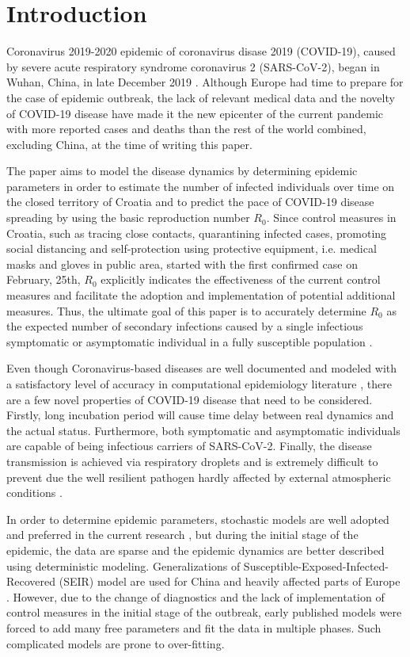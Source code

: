 \documentclass[conference]{IEEEtran}
\begin{document}
\section{Introduction}
\label{sec.introduction}
Coronavirus 2019-2020 epidemic of coronavirus disase 2019 (COVID-19), caused by severe acute respiratory syndrome coronavirus 2 (SARS-CoV-2), began in Wuhan, China, in late December 2019 \cite{who_covid_2020}. Although Europe had time to prepare for the case of epidemic outbreak, the lack of relevant medical data and the novelty of COVID-19 disease have made it the new epicenter of the current pandemic with more reported cases and deaths than the rest of the world combined, excluding China, at the time of writing this paper. 

The paper aims to model the disease dynamics by determining epidemic parameters in order to estimate the number of infected individuals over time on the closed territory of Croatia and to predict the pace of COVID-19 disease spreading by using the basic reproduction number $R_0$. Since control measures in Croatia, such as tracing close contacts, quarantining infected cases, promoting social distancing and self-protection using protective equipment, i.e. medical masks and gloves in public area, started with the first confirmed case on February, 25th, $R_0$ explicitly indicates the effectiveness of the current control measures and facilitate the adoption and implementation of potential additional measures. Thus, the ultimate goal of this paper is to accurately determine $R_0$ as the expected number of secondary infections caused by a single infectious symptomatic or asymptomatic individual in a fully susceptible population \cite{Kretzschmar2016}.

Even though Coronavirus-based diseases are well documented and modeled with a satisfactory level of accuracy in computational epidemiology literature \cite{Han2009}, there are a few novel properties of COVID-19 disease that need to be considered. Firstly, long incubation period will cause time delay between real dynamics and the actual status. Furthermore, both symptomatic and asymptomatic individuals are capable of being infectious carriers of SARS-CoV-2. Finally, the disease transmission is achieved via respiratory droplets and is extremely difficult to prevent due the well resilient pathogen hardly affected by external atmospheric conditions \cite{Guan2020}. 

In order to determine epidemic parameters, stochastic models are well adopted and preferred in the current research \cite{Marathe2020}, but during the initial stage of the epidemic, the data are sparse and the epidemic dynamics are better described using deterministic modeling. Generalizations of Susceptible-Exposed-Infected-Recovered (SEIR) model are used for China \cite{Peng2020,Zhao2020} and heavily affected parts of Europe \cite{Cereda2020,Lopez2020}. However, due to the change of diagnostics and the lack of implementation of control measures in the initial stage of the outbreak, early published models were forced to add many free parameters and fit the data in multiple phases. Such complicated models are prone to over-fitting. 
\end{document}
